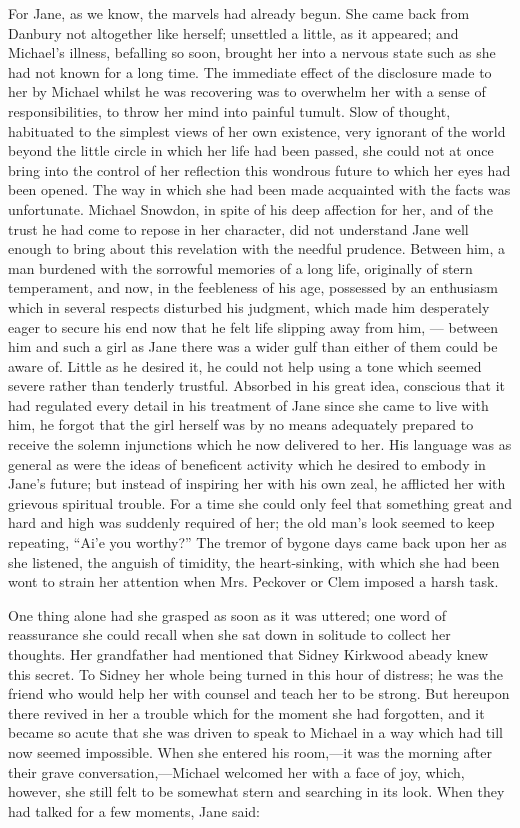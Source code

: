 For Jane, as we know, the marvels had {}already begun. She came back
from Danbury not altogether like herself; unsettled a little, as it
appeared; and Michael's illness, befalling so soon, brought her into a
nervous state such as she had not known for a long time. The immediate
effect of the disclosure made to her by Michael whilst he was recovering
was to overwhelm her with a sense of responsibilities, to throw her mind
into painful tumult. Slow of thought, habituated to the simplest views
of her own existence, very ignorant of the world beyond the little
circle in which her life had been passed, she could not at once bring
into the control of her reflection this wondrous future to which her
eyes had been opened. The way in which she had been made acquainted with
the facts was unfortunate. Michael Snowdon, in spite of his deep
affection for her, and of the trust he had come to repose in her
character, did not understand Jane well enough to bring about this
revelation with the needful prudence. Between him, a man burdened with
the sorrowful memories of a long life, originally of stern
{}temperament, and now, in the feebleness of his age, possessed by an
enthusiasm which in several respects disturbed his judgment, which made
him desperately eager to secure his end now that he felt life slipping
away from him, --- between him and such a girl as Jane there was a wider
gulf than either of them could be aware of. Little as he desired it, he
could not help using a tone which seemed severe rather than tenderly
trustful. Absorbed in his great idea, conscious that it had regulated
every detail in his treatment of Jane since she came to live with him,
he forgot that the girl herself was by no means adequately prepared to
receive the solemn injunctions which he now delivered to her. His
language was as general as were the ideas of beneficent activity which
he desired to embody in Jane's future; but instead of inspiring her with
his own zeal, he afflicted her with grievous spiritual trouble. For a
time she could only feel that something great and hard and high was
suddenly required of her; the old man's look seemed to keep repeating,
``Ai'e you worthy?'' {}The tremor of bygone days came back upon her as
she listened, the anguish of timidity, the heart-sinking, with which she
had been wont to strain her attention when Mrs. Peckover or Clem imposed
a harsh task.

One thing alone had she grasped as soon as it was uttered; one word of
reassurance she could recall when she sat down in solitude to collect
her thoughts. Her grandfather had mentioned that Sidney Kirkwood abeady
knew this secret. To Sidney her whole being turned in this hour of
distress; he was the friend who would help her with counsel and teach
her to be strong. But hereupon there revived in her a trouble which for
the moment she had forgotten, and it became so acute that she was driven
to speak to Michael in a way which had till now seemed impossible. When
she entered his room,---it was the morning after their grave
conversation,---Michael welcomed her with a face of joy, which, however,
she still felt to be somewhat stern and searching in its look. When they
had talked for a few moments, Jane said:

